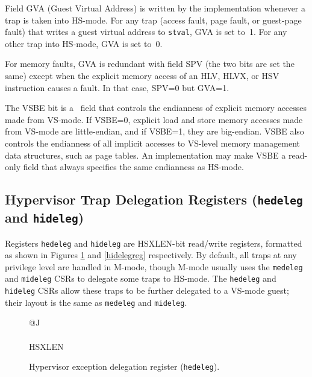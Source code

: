 Field GVA (Guest Virtual Address) is written by the implementation
whenever a trap is taken into HS-mode.
For any trap (access fault, page fault, or guest-page fault) that writes
a guest virtual address to {\tt stval}, GVA is set to~1.
For any other trap into HS-mode, GVA is set to~0.

\begin{commentary}
For memory faults, GVA is redundant with field SPV (the two bits are set
the same) except when the explicit memory access of an HLV, HLVX, or HSV
instruction causes a fault.
In that case, SPV=0 but GVA=1.
\end{commentary}

The VSBE bit is a \warl\ field that controls the endianness of explicit
memory accesses made from VS-mode.
If VSBE=0, explicit load and store memory accesses made from VS-mode are
little-endian, and if VSBE=1, they are big-endian.
VSBE also controls the endianness of all implicit accesses to VS-level
memory management data structures, such as page tables.
An implementation may make VSBE a read-only field that always specifies
the same endianness as HS-mode.

\subsection{Hypervisor Trap Delegation Registers ({\tt hedeleg} and {\tt hideleg})}

Registers {\tt hedeleg} and {\tt hideleg} are HSXLEN-bit read/write
registers, formatted as shown in Figures \ref{hedelegreg} and
\ref{hidelegreg} respectively.
By default, all traps at any privilege level are handled in M-mode, though
M-mode usually uses the {\tt medeleg} and {\tt mideleg} CSRs to delegate
some traps to HS-mode.  The {\tt hedeleg} and {\tt hideleg} CSRs allow these
traps to be further delegated to a VS-mode guest; their layout is the same
as {\tt medeleg} and {\tt mideleg}.

\begin{figure}[h!]
{\footnotesize
\begin{center}
\begin{tabular}{@{}J}
 \\
\hline
{} \\
\hline
HSXLEN \\
\end{tabular}
\end{center}
}
\vspace{-0.1in}
\caption{Hypervisor exception delegation register ({\tt hedeleg}).}
\label{hedelegreg}
\end{figure}

